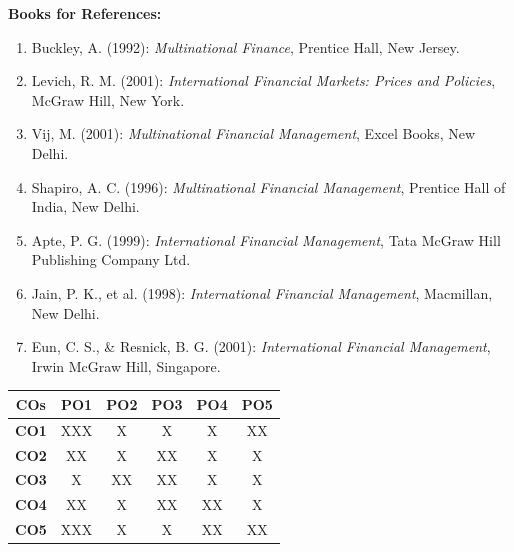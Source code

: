 \vspace{0.25em}
\noindent\textbf{Books for References:}
\begin{enumerate}[leftmargin=1.2em, label=\arabic*., itemsep=0pt, topsep=1pt, parsep=0pt]
    \scriptsize
    \item Buckley, A. (1992): \textit{Multinational Finance}, Prentice Hall, New Jersey.
    \item Levich, R. M. (2001): \textit{International Financial Markets: Prices and Policies}, McGraw Hill, New York.
    \item Vij, M. (2001): \textit{Multinational Financial Management}, Excel Books, New Delhi.
    \item Shapiro, A. C. (1996): \textit{Multinational Financial Management}, Prentice Hall of India, New Delhi.
    \item Apte, P. G. (1999): \textit{International Financial Management}, Tata McGraw Hill Publishing Company Ltd.
    \item Jain, P. K., et al. (1998): \textit{International Financial Management}, Macmillan, New Delhi.
    \item Eun, C. S., \& Resnick, B. G. (2001): \textit{International Financial Management}, Irwin McGraw Hill, Singapore.
\end{enumerate}

\vspace{0.2em}
\begin{center}
\scriptsize
\setlength{\tabcolsep}{6pt}
\renewcommand{\arraystretch}{0.95}
\begin{tabular}{|c|c|c|c|c|c|}
\hline
\textbf{COs} & \textbf{PO1} & \textbf{PO2} & \textbf{PO3} & \textbf{PO4} & \textbf{PO5} \\
\hline
\textbf{CO1} & XXX & X & X & X & XX \\
\hline
\textbf{CO2} & XX & X & XX & X & X \\
\hline
\textbf{CO3} & X & XX & XX & X & X \\
\hline
\textbf{CO4} & XX & X & XX & XX & X \\
\hline
\textbf{CO5} & XXX & X & X & XX & XX \\
\hline
\end{tabular}
\end{center}
\normalsize

\newpage

